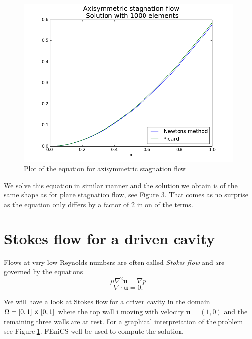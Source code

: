 \documentclass[11pt,a4paper,english]{article}
\numberwithin{equation}{section}
\begin{document}
\begin{figure}[h!]
\begin{center}
  \includegraphics[scale=0.4]{axisym_stag.png}
  \end{center}
  \caption{Plot of the equation for axisymmetric stagnation flow}
  \label{fig:stokes_square}
\end{figure}

We solve this equation in similar manner and the solution we obtain is of the same shape as for plane stagnation flow, see Figure 3. That comes as no surprise as the equation only differs by a factor of 2 in on of the terms.   

\section{Stokes flow for a driven cavity}
Flows at very low Reynolds numbers are often called \emph{Stokes flow} and are governed by the equations 
\begin{equation}
\mu \nabla^2 \mathbf{u} = \nabla p
\end{equation}
\begin{equation}
\nabla \cdot \mathbf{u} = 0.
\end{equation}

We will have a look at Stokes flow for a driven cavity in the domain $\Omega = [0,1] \cross [0,1]$ where the top wall i moving with velocity $\mathbf{u} = (1,0)$ and the remaining three walls are at rest. For a graphical interpretation of the problem see Figure \ref{fig:stokes_square}. FEniCS well be used to compute the solution. 
\end{document}
